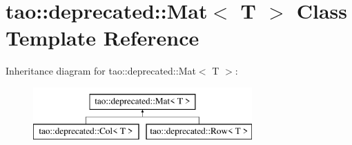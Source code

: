 \hypertarget{classtao_1_1deprecated_1_1_mat}{}\section{tao\+::deprecated\+::Mat$<$ T $>$ Class Template Reference}
\label{classtao_1_1deprecated_1_1_mat}
Inheritance diagram for tao\+::deprecated\+::Mat$<$ T $>$\+:\begin{figure}[H]
\begin{center}
\leavevmode
\includegraphics[height=2.000000cm]{classtao_1_1deprecated_1_1_mat}
\end{center}
\end{figure}
